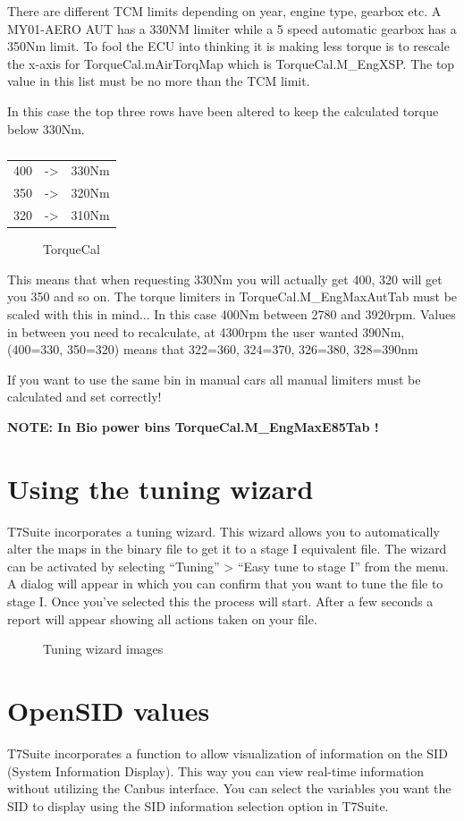 \documentclass[11pt,a4paper]{book}
\newcommand{\Mfig}[1]{%
\begin{figure}
    \centering
    \missingfigure{#1}
    \caption{#1}
\end{figure}}
\begin{document}
There are different TCM limits depending on year, engine type, gearbox etc.
A MY01-AERO AUT has a 330NM limiter while a 5 speed automatic gearbox has a 350Nm limit.
To fool the ECU into thinking it is making less torque is to rescale the x-axis for
TorqueCal.mAirTorqMap which is TorqueCal.M\_EngXSP. The top value in this list must be no
more than the TCM limit.

In this case the top three rows have been altered to keep the calculated torque below 330Nm.

\begin{table}
    \centering
    \begin{tabular}{ccc}
        400 & -> & 330Nm\\
        350 &-> &320Nm\\
        320 &->& 310Nm
    \end{tabular}
    \caption{}
    \label{tab:}
\end{table}
\Mfig{TorqueCal}

This means that when requesting 330Nm you will actually get 400, 320 will get you 350 and so on.
The torque limiters in TorqueCal.M\_EngMaxAutTab must be scaled with this in mind...
In this case 400Nm between 2780 and 3920rpm. Values in between you need to recalculate, at
4300rpm the user wanted 390Nm, (400=330, 350=320) means that 322=360, 324=370, 326=380,
328=390nm

\Mfig{}

If you want to use the same bin in manual cars all manual limiters must be calculated and set
correctly!

\textbf{NOTE: In Bio power bins TorqueCal.M\_EngMaxE85Tab !}

\chapter{Using the tuning wizard}
T7Suite incorporates a tuning wizard. This wizard allows you to automatically alter the maps in the
binary file to get it to a stage I equivalent file. The wizard can be activated by selecting “Tuning” >
“Easy tune to stage I” from the menu. A dialog will appear in which you can confirm that you want to
tune the file to stage I. Once you’ve selected this the process will start. After a few seconds a report
will appear showing all actions taken on your file.

\Mfig{Tuning wizard images}

\chapter{OpenSID values}
T7Suite incorporates a function to allow visualization of information on the SID (System Information
Display). This way you can view real-time information without utilizing the Canbus interface. You can
select the variables you want the SID to display using the SID information selection option in T7Suite.
\end{document}
